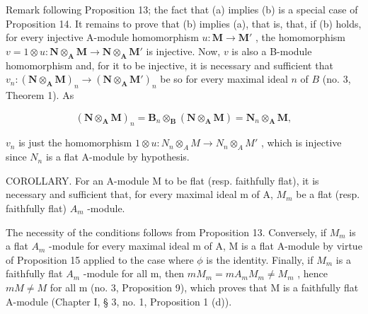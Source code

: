Remark following Proposition 13; the fact that (a) implies (b) is a special case of Proposition 14. It remains to prove that (b) implies (a), that is, that, if (b) holds, for every injective A-module homomorphism \(u: \mathbf{M} \to \mathbf{M}'\) , the homomorphism \(v = 1 \otimes u: \mathbf{N} \otimes_{\mathbf{A}} \mathbf{M} \to \mathbf{N} \otimes_{\mathbf{A}} \mathbf{M}'\) is injective. Now, \(v\) is also a B-module homomorphism and, for it to be injective, it is necessary and sufficient that \(v_n: (\mathbf{N} \otimes_{\mathbf{A}} \mathbf{M})_n \to (\mathbf{N} \otimes_{\mathbf{A}} \mathbf{M}')_n\) be so for every maximal ideal \(n\) of \(B\) (no. 3, Theorem 1). As

\[
(\mathbf {N} \otimes_ {\mathbf {A}} \mathbf {M}) _ {n} = \mathbf {B} _ {n} \otimes_ {\mathbf {B}} (\mathbf {N} \otimes_ {\mathbf {A}} \mathbf {M}) = \mathbf {N} _ {n} \otimes_ {\mathbf {A}} \mathbf {M},
\]

\(v_{n}\) is just the homomorphism \(1 \otimes u: N_{n} \otimes_{A} M \to N_{n} \otimes_{A} M'\) , which is injective since \(N_{n}\) is a flat A-module by hypothesis.

COROLLARY. For an A-module M to be flat (resp. faithfully flat), it is necessary and sufficient that, for every maximal ideal m of A, \(M_{m}\) be a flat (resp. faithfully flat) \(A_{m}\) -module.

The necessity of the conditions follows from Proposition 13. Conversely, if \(M_{m}\) is a flat \(A_{m}\) -module for every maximal ideal m of A, M is a flat A-module by virtue of Proposition 15 applied to the case where \(\phi\) is the identity. Finally, if \(M_{m}\) is a faithfully flat \(A_{m}\) -module for all m, then \(mM_{m} = mA_{m}M_{m} \neq M_{m}\) , hence \(mM \neq M\) for all m (no. 3, Proposition 9), which proves that M is a faithfully flat A-module (Chapter I, § 3, no. 1, Proposition 1 (d)).

